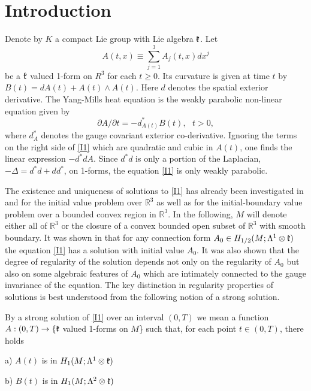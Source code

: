 \documentclass[12pt]{article}
\def \L{\Lambda}
\def \R{\mathbb R}
\def \kf{\frak k}
\def \p{\partial}
\def \beq{\begin{equation}}
\def \eeq{\end{equation}}
\def \eref{\eqref}
\numberwithin{equation}{section}
\begin{document}
\tableofcontents







\section{Introduction} \label{secintro}


      Denote by  $K$  a compact Lie group with Lie algebra $\kf$.  Let 
\beq
A(t,x) \equiv \sum_{j=1}^3 A_j(t, x) dx^j
\eeq
 be a $\kf$ valued 1-form on $R^3$ for each
$t \ge 0$. Its curvature is given at time $t$ by $B(t) = dA(t) + A(t)\wedge A(t)$. Here 
$d$ denotes the spatial exterior derivative. The Yang-Mills heat equation is the weakly parabolic non-linear equation given by 
\beq
\p A/\p t = - d_{A(t)}^* B(t), \ \ \ t >0,     \label{I1}
\eeq
where $d_A^*$ denotes the gauge covariant exterior co-derivative. 
Ignoring the terms on the right side of \eref{I1} which are quadratic and cubic in $A(t)$,
 one finds the linear expression  $ -d^*dA$.
Since $d^*d$
is only a portion of the Laplacian, $-\Delta = d^*d + dd^*$, on 1-forms, the equation \eref{I1}
is only weakly parabolic. 

            The existence and uniqueness of solutions to \eref{I1} has already
been investigated in \cite{CG1, CG2} and \cite{G70} for the initial value problem over $\R^3$ 
as well as for the initial-boundary value problem over a bounded convex region in $\R^3$.  
In the following, $M$ will denote either all of $\R^3$ or the closure of a convex bounded
 open subset of $\R^3$ with smooth boundary.
    It was shown in \cite{G70} that  for any connection form $A_0 \in H_{1/2}(M; \L^1\otimes \kf)$
the equation \eref{I1} has a solution with initial value $A_0$. 
It was also shown that the degree of  regularity of the solution
depends not only on the regularity of $A_0$ but also on some algebraic features of $A_0$
which are intimately connected to the gauge invariance of the equation. The key distinction
in regularity properties of solutions is best understood from  
 the  following notion of a strong solution.

By a strong solution of \eref{I1} over an interval $(0, T)$ we mean a function 
$A: (0, T)\rightarrow \{\kf$  valued 1-forms on  $M$\}  such that, 
for each point $t \in (0, T)$, there holds

a) $A(t)$ is in $H_1(M; \L^1\otimes \kf)$ 

b) $B(t)$ is in  $H_1(M; \L^2\otimes \kf)$ 
\end{document}
